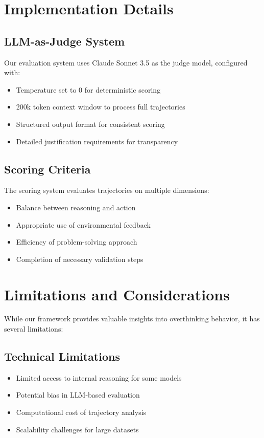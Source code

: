 \section{Implementation Details}
\label{sec:implementation}

\subsection{LLM-as-Judge System}
Our evaluation system uses Claude Sonnet 3.5 as the judge model, configured with:
\begin{itemize}
    \item Temperature set to 0 for deterministic scoring
    \item 200k token context window to process full trajectories
    \item Structured output format for consistent scoring
    \item Detailed justification requirements for transparency
\end{itemize}

\subsection{Scoring Criteria}
The scoring system evaluates trajectories on multiple dimensions:
\begin{itemize}
    \item Balance between reasoning and action
    \item Appropriate use of environmental feedback
    \item Efficiency of problem-solving approach
    \item Completion of necessary validation steps
\end{itemize}

\section{Limitations and Considerations}
\label{sec:limitations}

While our framework provides valuable insights into overthinking behavior, it has several limitations:

\subsection{Technical Limitations}
\begin{itemize}
    \item Limited access to internal reasoning for some models
    \item Potential bias in LLM-based evaluation
    \item Computational cost of trajectory analysis
    \item Scalability challenges for large datasets
\end{itemize}

